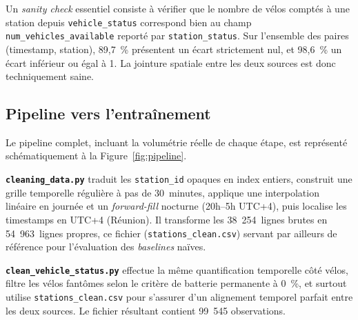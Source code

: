 \documentclass[fleqn, 12pt]{scrartcl}
\begin{document}
Un \textit{sanity check} essentiel consiste à vérifier que le nombre de vélos comptés à une station depuis \texttt{vehicle\_status} correspond bien au champ \texttt{num\_vehicles\_available} reporté par \texttt{station\_status}. Sur l'ensemble des paires (timestamp, station), 89{,}7~\% présentent un écart strictement nul, et 98{,}6~\% un écart inférieur ou égal à 1. La jointure spatiale entre les deux sources est donc techniquement saine.

\subsection{Pipeline vers l'entraînement}%
\label{ssec:pipeline}


\vspace{0.3cm}

Le pipeline complet, incluant la volumétrie réelle de chaque étape, est représenté schématiquement à la Figure~\ref{fig:pipeline}.

\vspace{0.3cm}

\textbf{\texttt{cleaning\_data.py}} traduit les \texttt{station\_id} opaques en index entiers, construit une grille temporelle régulière à pas de 30~minutes, applique une interpolation linéaire en journée et un \textit{forward-fill} nocturne (20h--5h UTC+4), puis localise les timestamps en UTC+4 (Réunion). Il transforme les 38~254~lignes brutes en 54~963~lignes propres, ce fichier (\texttt{stations\_clean.csv}) servant par ailleurs de référence pour l'évaluation des \textit{baselines} naïves.

\vspace{0.3cm}

\textbf{\texttt{clean\_vehicle\_status.py}} effectue la même quantification temporelle côté vélos, filtre les vélos fantômes selon le critère de batterie permanente à 0~\%, et surtout utilise \texttt{stations\_clean.csv} pour s'assurer d'un alignement temporel parfait entre les deux sources. Le fichier résultant contient 99~545 observations.
\end{document}
